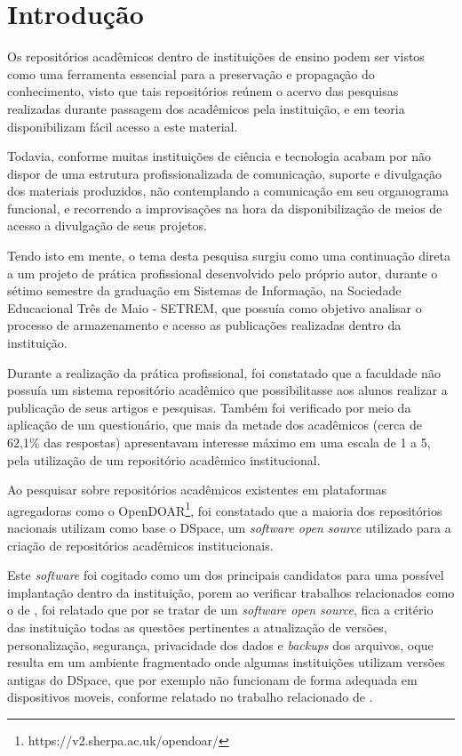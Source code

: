 \chapter*{Introdução} \label{chap:intro}

Os repositórios acadêmicos dentro de instituições de ensino
podem ser vistos como uma ferramenta essencial para a preservação
e propagação do conhecimento, visto que tais repositórios reúnem
o acervo das pesquisas realizadas durante passagem dos acadêmicos
pela instituição, e em teoria disponibilizam fácil acesso a este
material.

Todavia, conforme \cite{PORTO:difusao_cientifica_recortes}
muitas instituições de ciência e tecnologia acabam por não
dispor de uma estrutura profissionalizada de comunicação,
suporte e divulgação dos materiais produzidos, não contemplando
a comunicação em seu organograma funcional, e recorrendo a
improvisações na hora da disponibilização de meios de acesso
a divulgação de seus projetos.

Tendo isto em mente, o tema desta pesquisa surgiu como uma
continuação direta a um projeto de prática profissional
desenvolvido pelo próprio autor, durante o sétimo
semestre da graduação em Sistemas de Informação, na
Sociedade Educacional Três de Maio - SETREM, que possuía
como objetivo analisar o processo de armazenamento e
acesso as publicações realizadas dentro da instituição.

Durante a realização da prática profissional, foi constatado
que a faculdade não possuía um sistema repositório acadêmico
que possibilitasse aos alunos realizar a publicação de seus
artigos e pesquisas. Também foi verificado por meio da aplicação
de um questionário, que mais da metade dos acadêmicos
(cerca de 62,1\% das respostas) apresentavam interesse máximo
em uma escala de 1 a 5, pela utilização de um repositório acadêmico
institucional.

Ao pesquisar sobre repositórios acadêmicos existentes em plataformas
agregadoras como o OpenDOAR\footnote{https://v2.sherpa.ac.uk/opendoar/},
foi constatado que a maioria dos repositórios nacionais utilizam como
base o DSpace, um \emph{software open source} utilizado para a
criação de repositórios acadêmicos institucionais.

Este \emph{software} foi cogitado como um dos principais candidatos
para uma possível implantação dentro da instituição, porem ao verificar
trabalhos relacionados como o de \cite{GarciaRodrigoMoreira2019DdnB},
foi relatado que por se tratar de um \emph{software open source},
fica a critério das instituição todas as questões pertinentes a
atualização de versões, personalização, segurança, privacidade dos
dados e \emph{backups} dos arquivos, oque resulta em um ambiente
fragmentado onde algumas instituições utilizam versões antigas
do DSpace, que por exemplo não funcionam de forma adequada em
dispositivos moveis, conforme relatado no trabalho relacionado
de \cite{FernandesMacedes:2019}.

